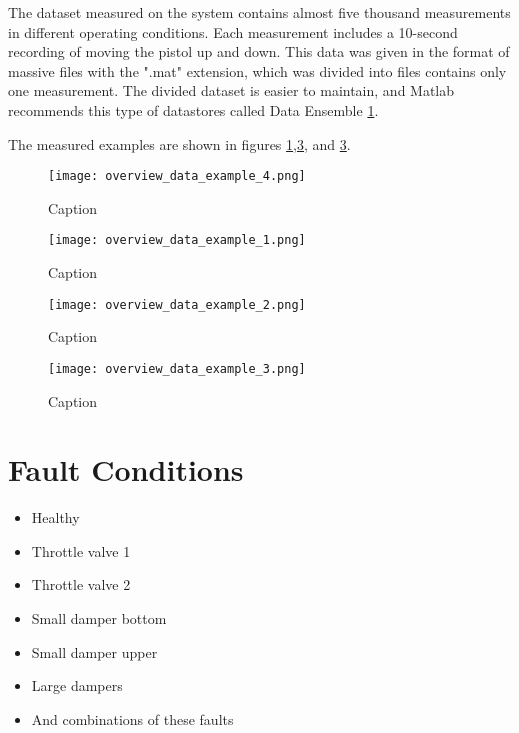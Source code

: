 The dataset measured on the system contains almost five thousand
measurements in different operating conditions. Each measurement includes a
10-second recording of moving the pistol up and down. This data was given
in the format of massive files with the ".mat" extension, which was divided
into files contains only one measurement.  The divided dataset is easier to
maintain, and Matlab recommends this type of datastores called Data
Ensemble \ref{}.

The measured examples are shown in figures
\ref{fig:over_examp_1},\ref{fig:over_examp_3}, and \ref{fig:over_examp_3}.

\begin{figure}[!htb]
    \centering
    \texttt{[image: overview\_data\_example\_4.png]}
    \caption{Caption}
    \label{fig:over_examp_1}
\end{figure}


\newpage
\begin{figure}[!htb]
    \centering
    \texttt{[image: overview\_data\_example\_1.png]}
    \caption{Caption}
    \label{fig:over_examp_2}
\end{figure}

\begin{figure}[!htb]
    \centering
    \texttt{[image: overview\_data\_example\_2.png]}
    \caption{Caption}
    \label{fig:over_examp_3}
\end{figure}

\begin{figure}[!htb]
    \centering
    \texttt{[image: overview\_data\_example\_3.png]}
    \caption{Caption}
    \label{fig:over_examp_4}
\end{figure}


\section{Fault Conditions}


\begin{itemize}
    \item Healthy
    \item Throttle valve 1
    \item Throttle valve 2 
    \item Small damper bottom
    \item Small damper upper
    \item Large dampers 
    \item And combinations of these faults
\end{itemize}


